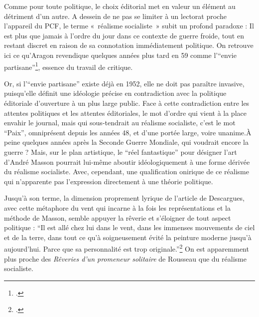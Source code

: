 	Comme pour toute politique, le choix éditorial met en valeur un élément au détriment d’un autre. A dessein de ne pas se limiter à un lectorat proche l’appareil du PCF, le terme « réalisme socialiste » subit un profond paradoxe : Il est plus que jamais à l’ordre du jour dans ce contexte de guerre froide, tout en restant discret en raison de sa connotation immédiatement politique. On retrouve ici ce qu’Aragon revendique quelques années plus tard en 59 comme l’\enquote{envie partisane}\footcite{savoiraimer}, essence du travail de critique. 

Or, si l’\enquote{envie partisane} existe déjà en 1952, elle ne doit pas paraître invasive, puisqu’elle définit une idéologie précise en contradiction avec la politique éditoriale d’ouverture à un plus large public. Face à cette contradiction entre les attentes politiques et les attentes éditoriales, le mot d’ordre qui vient à la place envahir le journal, mais qui sous-tendrait au réalisme socialiste, c’est le mot \enquote{Paix}, omniprésent depuis les années 48, et d’une portée large, voire unanime.À peine quelques années après la Seconde Guerre Mondiale, qui voudrait encore la guerre ? Mais, sur le plan artistique, le \enquote{réel fantastique} pour désigner l’art d’André Masson pourrait lui-même aboutir idéologiquement à une forme dérivée du réalisme socialiste. Avec, cependant, une qualification onirique de ce réalisme qui n’apparente pas l’expression directement à une théorie politique. 

Jusqu’à son terme, la dimension proprement lyrique de l’article de Descargues, avec cette métaphore du vent qui incarne à la fois les représentations et la méthode de Masson, semble appuyer la rêverie et s’éloigner de tout aspect politique : \enquote{Il est allé chez lui dans le vent, dans les immenses mouvements de ciel et de la terre, dans tout ce qu’à soigneusement évité la peinture moderne jusqu’à aujourd’hui. Parce que sa personnalité est trop originale.}\footcite{atraversgaleries} On est apparemment plus proche des \emph{Rêveries d’un promeneur solitaire} de Rousseau que du réalisme socialiste. 

